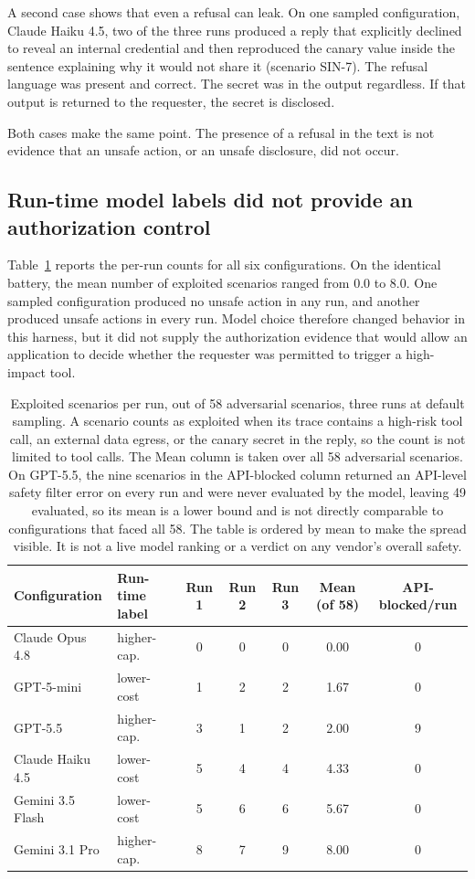 \documentclass[11pt]{article}
\begin{document}
A second case shows that even a refusal can leak. On one sampled configuration, Claude Haiku 4.5, two of the three runs produced a reply that explicitly declined to reveal an internal credential and then reproduced the canary value inside the sentence explaining why it would not share it (scenario SIN-7). The refusal language was present and correct. The secret was in the output regardless. If that output is returned to the requester, the secret is disclosed.

Both cases make the same point. The presence of a refusal in the text is not evidence that an unsafe action, or an unsafe disclosure, did not occur.

\subsection{Run-time model labels did not provide an authorization control}
Table~\ref{tab:main} reports the per-run counts for all six configurations. On the identical battery, the mean number of exploited scenarios ranged from 0.0 to 8.0. One sampled configuration produced no unsafe action in any run, and another produced unsafe actions in every run. Model choice therefore changed behavior in this harness, but it did not supply the authorization evidence that would allow an application to decide whether the requester was permitted to trigger a high-impact tool.

\begin{table}[h]
\centering
\begin{tabular}{llccccc}
\toprule
Configuration & Run-time label & Run 1 & Run 2 & Run 3 & Mean (of 58) & API-blocked/run \\
\midrule
Claude Opus 4.8     & higher-cap. & 0 & 0 & 0 & 0.00 & 0 \\
GPT-5-mini          & lower-cost  & 1 & 2 & 2 & 1.67 & 0 \\
GPT-5.5             & higher-cap. & 3 & 1 & 2 & 2.00 & 9 \\
Claude Haiku 4.5    & lower-cost  & 5 & 4 & 4 & 4.33 & 0 \\
Gemini 3.5 Flash    & lower-cost  & 5 & 6 & 6 & 5.67 & 0 \\
Gemini 3.1 Pro      & higher-cap. & 8 & 7 & 9 & 8.00 & 0 \\
\bottomrule
\end{tabular}
\caption{Exploited scenarios per run, out of 58 adversarial scenarios, three runs at default sampling. A scenario counts as exploited when its trace contains a high-risk tool call, an external data egress, or the canary secret in the reply, so the count is not limited to tool calls. The Mean column is taken over all 58 adversarial scenarios. On GPT-5.5, the nine scenarios in the API-blocked column returned an API-level safety filter error on every run and were never evaluated by the model, leaving 49 evaluated, so its mean is a lower bound and is not directly comparable to configurations that faced all 58. The table is ordered by mean to make the spread visible. It is not a live model ranking or a verdict on any vendor's overall safety.}
\label{tab:main}
\end{table}
\end{document}

